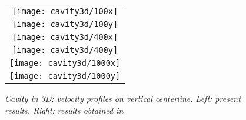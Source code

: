 \begin{figure}[htbp]
\centering
\begin{tabular}{c}
\hspace{-0.5cm} 
\texttt{[image: cavity3d/100x]}\\
\hspace{-0.5cm} 
\texttt{[image: cavity3d/100y]}\\
\hspace{-0.5cm} 
\texttt{[image: cavity3d/400x]}\\
\hspace{-0.5cm} 
\texttt{[image: cavity3d/400y]}\\
\hspace{-0.5cm}
\texttt{[image: cavity3d/1000x]}\\
\hspace{-0.5cm} 
\texttt{[image: cavity3d/1000y]}\\
\end{tabular}
\caption{\em Cavity in 3D: velocity profiles on vertical centerline. Left: present results. Right: results obtained in \cite{Ku87}} \label{Ku}
\end{figure}
